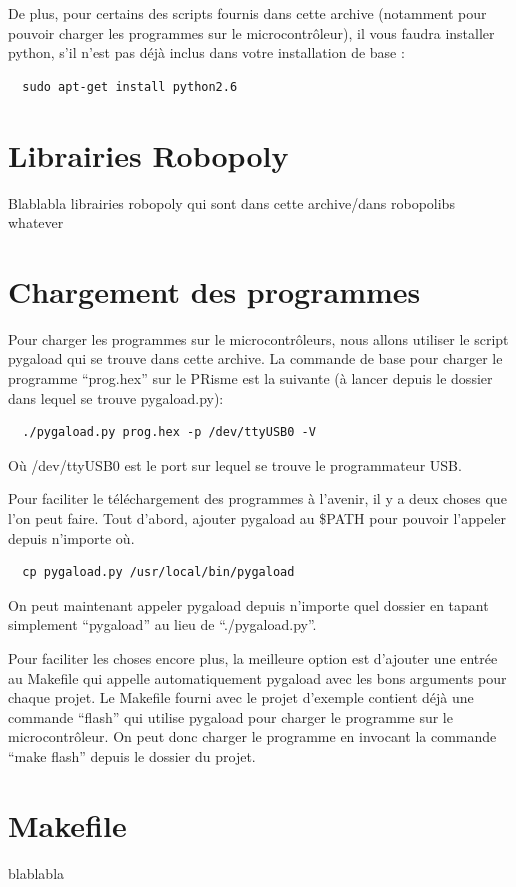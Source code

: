 \documentclass[a4paper]{article}
\begin{document}
De plus, pour certains des scripts fournis dans cette archive (notamment pour
pouvoir charger les programmes sur le microcontrôleur), il vous faudra installer
python, s'il n'est pas déjà inclus dans votre installation de base :

\begin{lstlisting}
  sudo apt-get install python2.6
\end{lstlisting}

\section{Librairies Robopoly}
Blablabla librairies robopoly qui sont dans cette archive/dans robopolibs
whatever

\section{Chargement des programmes}
Pour charger les programmes sur le microcontrôleurs, nous allons utiliser le
script pygaload qui se trouve dans cette archive. La commande de base pour
charger le programme ``prog.hex'' sur le PRisme est la suivante (à lancer depuis
le dossier dans lequel se trouve pygaload.py):
\begin{lstlisting}
  ./pygaload.py prog.hex -p /dev/ttyUSB0 -V
\end{lstlisting}
Où /dev/ttyUSB0 est le port sur lequel se trouve le programmateur USB.

Pour faciliter le téléchargement des programmes à l'avenir, il y a deux choses
que l'on peut faire. Tout d'abord, ajouter pygaload au \$PATH pour pouvoir
l'appeler depuis n'importe où.

\begin{lstlisting}
  cp pygaload.py /usr/local/bin/pygaload
\end{lstlisting}

On peut maintenant appeler pygaload depuis n'importe quel dossier en tapant
simplement ``pygaload'' au lieu de ``./pygaload.py''.

Pour faciliter les choses encore plus, la meilleure option est d'ajouter une
entrée au Makefile qui appelle automatiquement pygaload avec les bons arguments
pour chaque projet. Le Makefile fourni avec le projet d'exemple contient déjà
une commande ``flash'' qui utilise pygaload pour charger le programme sur le
microcontrôleur. On peut donc charger le programme en invocant la commande
``make flash'' depuis le dossier du projet.

\section{Makefile}
blablabla
\end{document}
